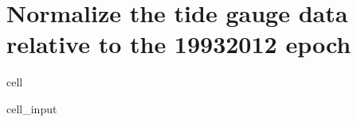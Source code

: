\documentclass[letterpaper,10pt,english]{jupyterBook}
\begin{document}
\section{Normalize the tide gauge data relative to the 1993\sphinxhyphen{}2012 epoch}
\label{\detokenize{notebooks/SL_Data_Wrangling:normalize-the-tide-gauge-data-relative-to-the-1993-2012-epoch}}
\begin{sphinxuseclass}{cell}\begin{sphinxVerbatimInput}

\begin{sphinxuseclass}{cell_input}
\begin{sphinxVerbatim}[commandchars=\\\{\}]
    
   
  
\end{sphinxVerbatim}

\end{sphinxuseclass}\end{sphinxVerbatimInput}

\end{sphinxuseclass}
\end{document}

